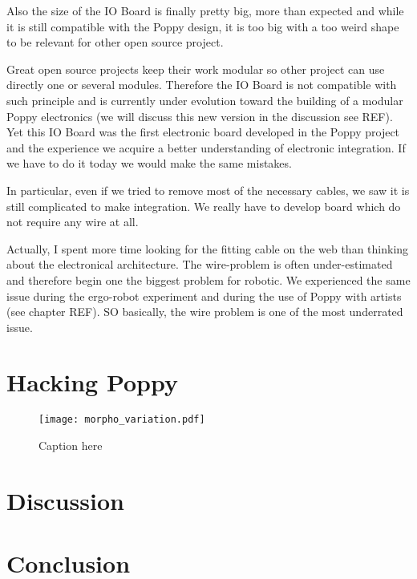 Also the size of the IO Board is finally pretty big, more than expected and while it is still compatible with the Poppy design, it is too big with a too weird shape to be relevant for other open source project.

Great open source projects keep their work modular so other project can use directly one or several modules. Therefore the IO Board is not compatible with such principle and is currently under evolution toward the building of a modular Poppy electronics (we will discuss this new version in the discussion see REF). Yet this IO Board was the first electronic board developed in the Poppy project and the experience we acquire a better understanding of electronic integration. If we have to do it today we would make the same mistakes.

In particular, even if we tried to remove most of the necessary cables, we saw it is still complicated to make integration. We really have to develop board which do not require any wire at all.

Actually, I spent more time looking for the fitting cable on the web than thinking about the electronical architecture. The wire-problem is often under-estimated and therefore begin one the biggest problem for robotic. We experienced the same issue during the ergo-robot experiment and during the use of Poppy with artists (see chapter REF). SO basically, the wire problem is one of the most underrated issue.





\section{Hacking Poppy} %

\begin{figure}[tb]
    \begin{center}
        \texttt{[image: morpho\_variation.pdf]}
    \end{center}
    \caption{Caption here}
    \label{fig:figure1}
\end{figure}


\section{Discussion}

\section{Conclusion}


